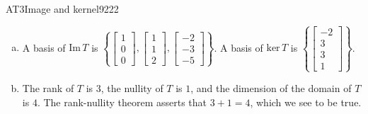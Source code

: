 \begin{exercise}{AT3}{Image and kernel}{9222}
\begin{exerciseAnswer}
\begin{enumerate}[(a)]
 
\item  

 A basis of \(\mathrm{Im}\,T\) is \(\left\{ \left[\begin{array}{c}
1 \\
0 \\
0
\end{array}\right] , \left[\begin{array}{c}
1 \\
1 \\
2
\end{array}\right] , \left[\begin{array}{c}
-2 \\
-3 \\
-5
\end{array}\right] \right\}\). A basis of \(\mathrm{ker}\,T\) is \(\left\{ \left[\begin{array}{c}
-2 \\
3 \\
3 \\
1
\end{array}\right] \right\}\). 

 
\item  

 The rank of \(T\) is \(3\), the nullity of \(T\) is \(1\), and the dimension of the domain of \(T\) is \(4\). The rank-nullity theorem asserts that \(3+1=4\), which we see to be true. 

 
\end{enumerate}

     \end{exerciseAnswer}
 \end{exercise}


